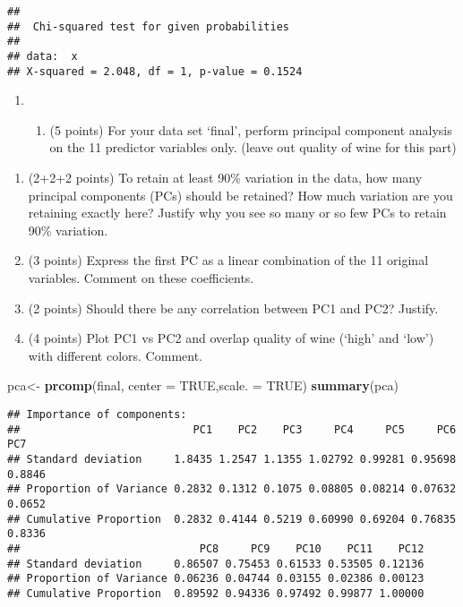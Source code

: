\documentclass[
]{article}
\newenvironment{Shaded}{\begin{snugshade}}{\end{snugshade}}
\newcommand{\DataTypeTok}[1]{\textcolor[rgb]{0.13,0.29,0.53}{#1}}
\newcommand{\KeywordTok}[1]{\textcolor[rgb]{0.13,0.29,0.53}{\textbf{#1}}}
\newcommand{\NormalTok}[1]{#1}
\newcommand{\OtherTok}[1]{\textcolor[rgb]{0.56,0.35,0.01}{#1}}
\newcommand{\StringTok}[1]{\textcolor[rgb]{0.31,0.60,0.02}{#1}}
\providecommand{\tightlist}{%
  \setlength{\itemsep}{0pt}\setlength{\parskip}{0pt}}
\begin{document}
\begin{verbatim}
## 
##  Chi-squared test for given probabilities
## 
## data:  x
## X-squared = 2.048, df = 1, p-value = 0.1524
\end{verbatim}

\begin{enumerate}
\def\labelenumi{\arabic{enumi}.}
\setcounter{enumi}{5}
\item
  \begin{enumerate}
  \def\labelenumii{(\alph{enumii})}
  \tightlist
  \item
    (5 points) For your data set `final', perform principal component
    analysis on the 11 predictor variables only. (leave out quality of
    wine for this part)
  \end{enumerate}
\end{enumerate}

\begin{enumerate}
\def\labelenumi{(\alph{enumi})}
\setcounter{enumi}{1}
\tightlist
\item
  (2+2+2 points) To retain at least 90\% variation in the data, how many
  principal components (PCs) should be retained? How much variation are
  you retaining exactly here? Justify why you see so many or so few PCs
  to retain 90\% variation.
\item
  (3 points) Express the first PC as a linear combination of the 11
  original variables. Comment on these coefficients.
\item
  (2 points) Should there be any correlation between PC1 and PC2?
  Justify.
\item
  (4 points) Plot PC1 vs PC2 and overlap quality of wine (`high' and
  `low') with different colors. Comment.
\end{enumerate}

\begin{Shaded}
\begin{Highlighting}[]
\NormalTok{pca<-}\StringTok{ }\KeywordTok{prcomp}\NormalTok{(final, }\DataTypeTok{center =} \OtherTok{TRUE}\NormalTok{,}\DataTypeTok{scale. =} \OtherTok{TRUE}\NormalTok{)}
\KeywordTok{summary}\NormalTok{(pca)}
\end{Highlighting}
\end{Shaded}

\begin{verbatim}
## Importance of components:
##                           PC1    PC2    PC3     PC4     PC5     PC6    PC7
## Standard deviation     1.8435 1.2547 1.1355 1.02792 0.99281 0.95698 0.8846
## Proportion of Variance 0.2832 0.1312 0.1075 0.08805 0.08214 0.07632 0.0652
## Cumulative Proportion  0.2832 0.4144 0.5219 0.60990 0.69204 0.76835 0.8336
##                            PC8     PC9    PC10    PC11    PC12
## Standard deviation     0.86507 0.75453 0.61533 0.53505 0.12136
## Proportion of Variance 0.06236 0.04744 0.03155 0.02386 0.00123
## Cumulative Proportion  0.89592 0.94336 0.97492 0.99877 1.00000
\end{verbatim}
\end{document}
